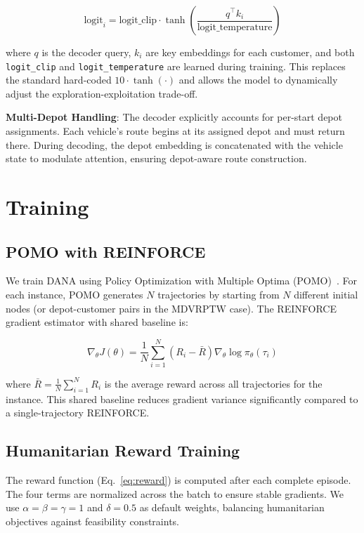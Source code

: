 \documentclass[12pt,a4paper]{article}
\begin{document}
\begin{equation}
	\text{logit}_i = \text{logit\_clip} \cdot \tanh\left(\frac{q^\top k_i}{\text{logit\_temperature}}\right)
\end{equation}

where $q$ is the decoder query, $k_i$ are key embeddings for each customer,
and both \texttt{logit\_clip} and \texttt{logit\_temperature} are learned
during training. This replaces the standard hard-coded $10 \cdot \tanh(\cdot)$
and allows the model to dynamically adjust the exploration-exploitation trade-off.

\textbf{Multi-Depot Handling}: The decoder explicitly accounts for per-start
depot assignments. Each vehicle's route begins at its assigned depot and must
return there. During decoding, the depot embedding is concatenated with the
vehicle state to modulate attention, ensuring depot-aware route construction.

\section{Training}

\subsection{POMO with REINFORCE}

We train DANA using Policy Optimization with Multiple Optima
(POMO)~\cite{pomo2020}. For each instance, POMO generates $N$ trajectories by
starting from $N$ different initial nodes (or depot-customer pairs in the
MDVRPTW case). The REINFORCE gradient estimator with shared baseline is:

\begin{equation}
	\nabla_\theta J(\theta) = \frac{1}{N} \sum_{i=1}^N \left(R_i - \bar{R}\right) \nabla_\theta \log \pi_\theta(\tau_i)
\end{equation}

where $\bar{R} = \frac{1}{N} \sum_{i=1}^N R_i$ is the average reward across
all trajectories for the instance. This shared baseline reduces gradient
variance significantly compared to a single-trajectory REINFORCE.

\subsection{Humanitarian Reward Training}

The reward function (Eq.~\ref{eq:reward}) is computed after each complete
episode. The four terms are normalized across the batch to ensure stable
gradients. We use $\alpha = \beta = \gamma = 1$ and $\delta = 0.5$ as default
weights, balancing humanitarian objectives against feasibility constraints.
\end{document}
